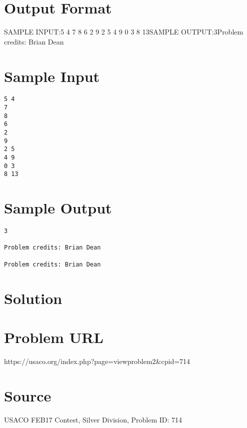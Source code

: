 \documentclass[12pt]{article}
\begin{document}
\section*{Output Format}
SAMPLE INPUT:5 4
7
8
6
2
9
2 5
4 9
0 3
8 13SAMPLE OUTPUT:3Problem credits: Brian Dean

\section*{Sample Input}
\begin{verbatim}
5 4
7
8
6
2
9
2 5
4 9
0 3
8 13
\end{verbatim}

\section*{Sample Output}
\begin{verbatim}
3

Problem credits: Brian Dean

Problem credits: Brian Dean
\end{verbatim}

\section*{Solution}


\section*{Problem URL}
https://usaco.org/index.php?page=viewproblem2&cpid=714

\section*{Source}
USACO FEB17 Contest, Silver Division, Problem ID: 714
\end{document}

